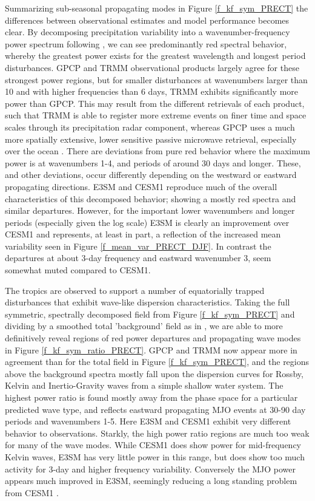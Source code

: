 \documentclass[draft,ms]{AGUTeX}
\begin{document}
\begin{article}
Summarizing sub-seasonal propagating modes in Figure \ref{f_kf_sym_PRECT} the differences between observational estimates and model performance becomes clear. By decomposing precipitation variability into a wavenumber-frequency power spectrum following \cite{Wheeler1999}, we can see predominantly red spectral behavior, whereby the greatest power exists for the greatest wavelength and longest period disturbances. GPCP and TRMM observational products largely agree for these strongest power regions, but for smaller disturbances at wavenumbers larger than 10 and with higher frequencies than 6 days, TRMM exhibits significantly more power than GPCP. This may result from the different retrievals of each product, such that TRMM is able to register more extreme events on finer time and space scales through its precipitation radar component, whereas GPCP uses a much more spatially extensive, lower sensitive passive microwave retrieval, especially over the ocean \citep{Rui2005}. There are deviations from pure red behavior where the maximum power is at wavenumbers 1-4, and periods of around 30 days and longer. These, and other deviations, occur differently depending on the westward or eastward propagating directions. E3SM and CESM1 reproduce much of the overall characteristics of this decomposed behavior; showing a mostly red spectra and similar departures. However, for the important lower wavenumbers and longer periods (especially given the log scale) E3SM is clearly an improvement over CESM1 and represents, at least in part, a reflection of the increased mean variability seen in Figure \ref{f_mean_var_PRECT_DJF}. In contrast the departures at about 3-day frequency and eastward wavenumber 3, seem somewhat muted compared to CESM1.

The tropics are observed to support a number of equatorially trapped disturbances that exhibit wave-like dispersion characteristics. Taking the full symmetric, spectrally decomposed field from Figure \ref{f_kf_sym_PRECT} and dividing by a smoothed total 'background' field as in \cite{Wheeler1999}, we are able to more definitively reveal regions of red power departures and propagating wave modes in Figure \ref{f_kf_sym_ratio_PRECT}. GPCP and TRMM now appear more in agreement than for the total field in Figure \ref{f_kf_sym_PRECT}, and the regions above the background spectra mostly fall upon the dispersion curves for Rossby, Kelvin and Inertio-Gravity waves from a simple shallow water system. The highest power ratio is found mostly away from the phase space for a particular predicted wave type, and reflects eastward propagating MJO events at 30-90 day periods and wavenumbers 1-5.  Here E3SM and CESM1 exhibit very different behavior to observations. Starkly, the high power ratio regions are much too weak for many of the wave modes. While CESM1 does show power for mid-frequency Kelvin waves, E3SM has very little power in this range, but does show too much activity for 3-day and higher frequency variability. Conversely the MJO power appears much improved in E3SM, seemingly reducing a long standing problem from CESM1 \citep{Subramanian2014,Ahn2017}.


\end{article}
\end{document}

